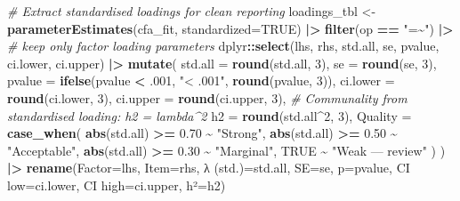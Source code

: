 \documentclass[
]{article}
\newenvironment{Shaded}{\begin{snugshade}}{\end{snugshade}}
\newcommand{\AttributeTok}[1]{\textcolor[rgb]{0.13,0.29,0.53}{#1}}
\newcommand{\CommentTok}[1]{\textcolor[rgb]{0.56,0.35,0.01}{\textit{#1}}}
\newcommand{\ConstantTok}[1]{\textcolor[rgb]{0.56,0.35,0.01}{#1}}
\newcommand{\DecValTok}[1]{\textcolor[rgb]{0.00,0.00,0.81}{#1}}
\newcommand{\FloatTok}[1]{\textcolor[rgb]{0.00,0.00,0.81}{#1}}
\newcommand{\FunctionTok}[1]{\textcolor[rgb]{0.13,0.29,0.53}{\textbf{#1}}}
\newcommand{\NormalTok}[1]{#1}
\newcommand{\OtherTok}[1]{\textcolor[rgb]{0.56,0.35,0.01}{#1}}
\newcommand{\SpecialCharTok}[1]{\textcolor[rgb]{0.81,0.36,0.00}{\textbf{#1}}}
\newcommand{\StringTok}[1]{\textcolor[rgb]{0.31,0.60,0.02}{#1}}
\begin{document}
\begin{Shaded}
\begin{Highlighting}[]
\CommentTok{\# Extract standardised loadings for clean reporting}
\NormalTok{loadings\_tbl }\OtherTok{\textless{}{-}} \FunctionTok{parameterEstimates}\NormalTok{(cfa\_fit, }\AttributeTok{standardized=}\ConstantTok{TRUE}\NormalTok{) }\SpecialCharTok{|\textgreater{}}
  \FunctionTok{filter}\NormalTok{(op }\SpecialCharTok{==} \StringTok{"=\textasciitilde{}"}\NormalTok{) }\SpecialCharTok{|\textgreater{}}      \CommentTok{\# keep only factor loading parameters}
\NormalTok{  dplyr}\SpecialCharTok{::}\FunctionTok{select}\NormalTok{(lhs, rhs, std.all, se, pvalue, ci.lower, ci.upper) }\SpecialCharTok{|\textgreater{}}
  \FunctionTok{mutate}\NormalTok{(}
    \AttributeTok{std.all  =} \FunctionTok{round}\NormalTok{(std.all, }\DecValTok{3}\NormalTok{),}
    \AttributeTok{se       =} \FunctionTok{round}\NormalTok{(se, }\DecValTok{3}\NormalTok{),}
    \AttributeTok{pvalue   =} \FunctionTok{ifelse}\NormalTok{(pvalue }\SpecialCharTok{\textless{}}\NormalTok{ .}\DecValTok{001}\NormalTok{, }\StringTok{"\textless{} .001"}\NormalTok{, }\FunctionTok{round}\NormalTok{(pvalue, }\DecValTok{3}\NormalTok{)),}
    \AttributeTok{ci.lower =} \FunctionTok{round}\NormalTok{(ci.lower, }\DecValTok{3}\NormalTok{),}
    \AttributeTok{ci.upper =} \FunctionTok{round}\NormalTok{(ci.upper, }\DecValTok{3}\NormalTok{),}
    \CommentTok{\# Communality from standardised loading: h2 = lambda\^{}2}
    \AttributeTok{h2       =} \FunctionTok{round}\NormalTok{(std.all}\SpecialCharTok{\^{}}\DecValTok{2}\NormalTok{, }\DecValTok{3}\NormalTok{),}
    \AttributeTok{Quality  =} \FunctionTok{case\_when}\NormalTok{(}
      \FunctionTok{abs}\NormalTok{(std.all) }\SpecialCharTok{\textgreater{}=} \FloatTok{0.70} \SpecialCharTok{\textasciitilde{}} \StringTok{"Strong"}\NormalTok{,}
      \FunctionTok{abs}\NormalTok{(std.all) }\SpecialCharTok{\textgreater{}=} \FloatTok{0.50} \SpecialCharTok{\textasciitilde{}} \StringTok{"Acceptable"}\NormalTok{,}
      \FunctionTok{abs}\NormalTok{(std.all) }\SpecialCharTok{\textgreater{}=} \FloatTok{0.30} \SpecialCharTok{\textasciitilde{}} \StringTok{"Marginal"}\NormalTok{,}
      \ConstantTok{TRUE}                 \SpecialCharTok{\textasciitilde{}} \StringTok{"Weak — review"}
\NormalTok{    )}
\NormalTok{  ) }\SpecialCharTok{|\textgreater{}}
  \FunctionTok{rename}\NormalTok{(}\AttributeTok{Factor=}\NormalTok{lhs, }\AttributeTok{Item=}\NormalTok{rhs, }\StringTok{\textasciigrave{}}\AttributeTok{λ (std.)}\StringTok{\textasciigrave{}}\OtherTok{=}\NormalTok{std.all, }\AttributeTok{SE=}\NormalTok{se, }\AttributeTok{p=}\NormalTok{pvalue,}
         \StringTok{\textasciigrave{}}\AttributeTok{CI low}\StringTok{\textasciigrave{}}\OtherTok{=}\NormalTok{ci.lower, }\StringTok{\textasciigrave{}}\AttributeTok{CI high}\StringTok{\textasciigrave{}}\OtherTok{=}\NormalTok{ci.upper, }\StringTok{\textasciigrave{}}\AttributeTok{h²}\StringTok{\textasciigrave{}}\OtherTok{=}\NormalTok{h2)}


\end{Highlighting}
\end{Shaded}
\end{document}
